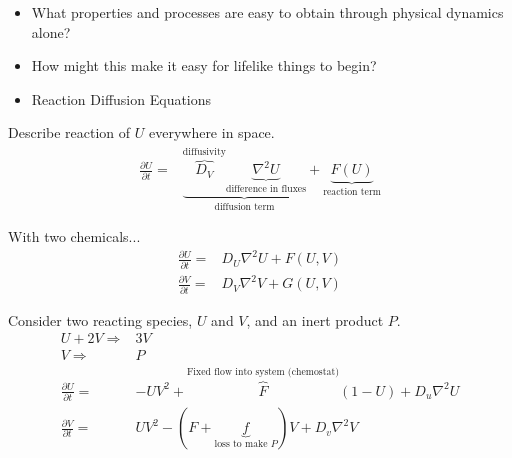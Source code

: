 \documentclass[]{article}
\begin{document}
\begin{itemize}
	\item What properties and processes are easy to obtain through physical dynamics alone?
	
	\item How might this make it easy for lifelike things to begin?
	
	\item Reaction Diffusion Equations\cite{sfi_grayscott2018}
\end{itemize}

Describe reaction of $U$ everywhere in space.
\begin{align*}
\frac{\partial U}{\partial t} =&   \underbrace{\overbrace{D_V}^\text{diffusivity} \underbrace{ \nabla^2 U }_\text{difference in fluxes}}_\text{diffusion term} + \underbrace{ F(U)}_\text{reaction term}
\end{align*}

With two chemicals...
\begin{align*}
\frac{\partial U}{\partial t} =&   D_U \nabla^2 U + F(U,V)\\
\frac{\partial V}{\partial t} =&   D_V \nabla^2 V + G(U,V)
\end{align*}

Consider two reacting species, $U$ and $V$, and an inert product $P$.
\begin{align*}
U + 2V \Longrightarrow& 3V\\
V \Longrightarrow& P\\
\frac{\partial U}{\partial t} =& -U V^2 + \overbrace{F}^\text{Fixed flow into system (chemostat)} (1 - U) + D_u \nabla^2 U \\
\frac{\partial V}{\partial t} =& U V^2 - (F +\underbrace{f}_\text{loss to make $P$}) V + D_v \nabla^2 V 
\end{align*}
\end{document}

